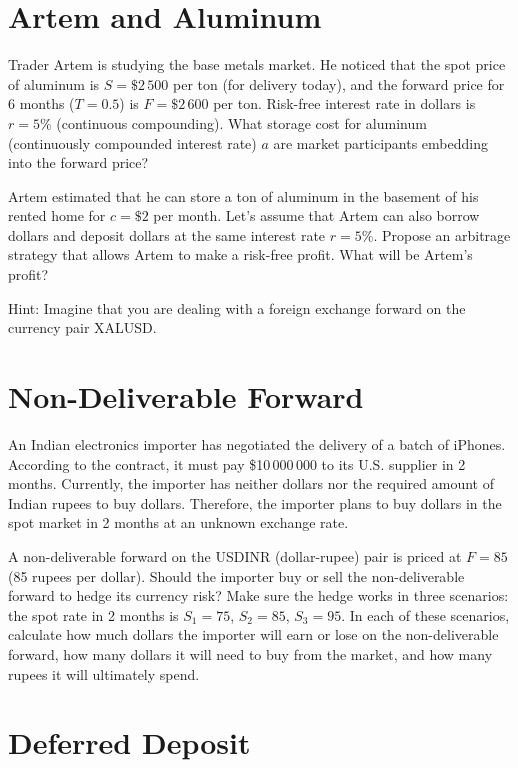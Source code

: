 \documentclass[a4paper,14pt]{extarticle}
\begin{document}
\section{Artem and Aluminum}

Trader Artem is studying the base metals market. He noticed that the spot price of aluminum is $S=\$2\,500$ per ton (for delivery today), and the forward price for 6 months ($T=0.5$) is $F=\$2\,600$ per ton. Risk-free interest rate in dollars is $r=5\%$ (continuous compounding). What storage cost for aluminum (continuously compounded interest rate) $a$ are market participants  embedding into the forward price?

Artem estimated that he can store a ton of aluminum in the basement of his rented home for $c=\$2$ per month. Let's assume that Artem can also borrow dollars and deposit dollars at the same interest rate $r=5\%$. Propose an arbitrage strategy that allows Artem to make a risk-free profit. What will be Artem's profit?

Hint: Imagine that you are dealing with a foreign exchange forward on the currency pair XALUSD.

\section{Non-Deliverable Forward}

An Indian electronics importer has negotiated the delivery of a batch of iPhones. According to the contract, it must pay \$10\,000\,000 to its U.S. supplier in 2 months. Currently, the importer has neither dollars nor the required amount of Indian rupees to buy dollars. Therefore, the importer plans to buy dollars in the spot market in 2 months at an unknown exchange rate.

A non-deliverable forward on the USDINR (dollar-rupee) pair is priced at $F=85$ (85 rupees per dollar). Should the importer buy or sell the non-deliverable forward to hedge its currency risk? Make sure the hedge works in three scenarios: the spot rate in 2 months is $S_1=75$, $S_2=85$, $S_3=95$. In each of these scenarios, calculate how much dollars the importer will earn or lose on the non-deliverable forward, how many dollars it will need to buy from the market, and how many rupees it will ultimately spend.

\section{Deferred Deposit}
\end{document}
